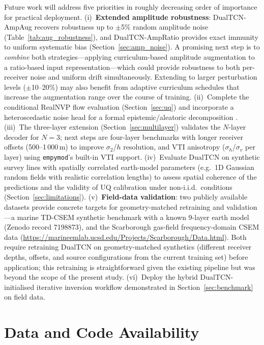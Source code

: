 \documentclass[journal]{IEEEtran}
\begin{document}
Future work will address five priorities in roughly decreasing order
of importance for practical deployment.
(i)~\textbf{Extended amplitude robustness}: DualTCN-AmpAug recovers
robustness up to $\pm$5\% random amplitude noise
(Table~\ref{tab:aug_robustness}), and DualTCN-AmpRatio provides
exact immunity to uniform systematic bias
(Section~\ref{sec:amp_noise}).  A promising next step is to
\emph{combine} both strategies---applying curriculum-based amplitude
augmentation to a ratio-based input representation---which could
provide robustness to both per-receiver noise and uniform drift
simultaneously.  Extending to larger perturbation levels
($\pm$10--20\%) may also benefit from adaptive curriculum schedules
that increase the augmentation range over the course of training.  (ii)~Complete the conditional RealNVP flow
evaluation (Section~\ref{sec:uq}) and incorporate a heteroscedastic
noise head for a formal epistemic/aleatoric decomposition
\citep{papamakarios2021normalizing}.  (iii)~The three-layer extension (Section~\ref{sec:multilayer})
validates the $N$-layer decoder for $N = 3$; next steps are
four-layer benchmarks with longer receiver offsets
(500--1\,000\,m) to improve $\sigma_2$/$h$ resolution, and
VTI anisotropy ($\sigma_h$/$\sigma_v$ per layer) using
\texttt{empymod}'s built-in VTI support.  (iv)~Evaluate DualTCN on synthetic
survey lines with spatially correlated earth-model parameters (e.g.\
1D Gaussian random fields with realistic correlation lengths) to
assess spatial coherence of the predictions and the validity of UQ
calibration under non-i.i.d.\ conditions
(Section~\ref{sec:limitations}).  (v)~\textbf{Field-data validation}: two publicly available datasets
provide concrete targets for geometry-matched retraining and
validation---a marine TD-CSEM synthetic benchmark with a known
9-layer earth model (Zenodo record 7198873), and the Scarborough
gas-field frequency-domain CSEM data \citep{key2012marine}
(\url{https://marineemlab.ucsd.edu/Projects/Scarborough/Data.html}).
Both require retraining DualTCN on geometry-matched synthetics
(different receiver depths, offsets, and source configurations from
the current training set) before application; this retraining is
straightforward given the existing pipeline but was beyond the scope
of the present study.  (vi)~Deploy the hybrid DualTCN-initialised iterative
inversion workflow demonstrated in Section~\ref{sec:benchmark} on
field data.

\section*{Data and Code Availability}
\end{document}
